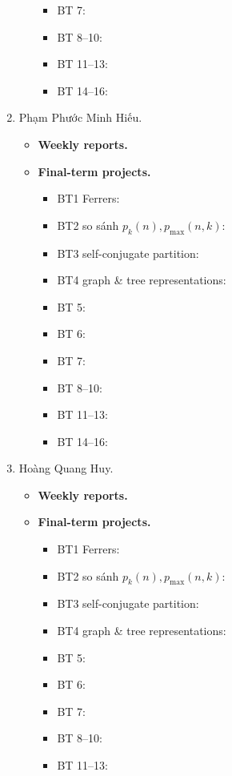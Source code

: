 \documentclass{article}
\begin{document}
\begin{enumerate}
\begin{itemize}
\begin{itemize}
            \item BT 7:
            \item BT 8--10:
            \item BT 11--13:
            \item BT 14--16:
        \end{itemize}
    \end{itemize}
    \item {\sc Phạm Phước Minh Hiếu.}
    \begin{itemize}
        \item {\bf Weekly reports.}
        \item {\bf Final-term projects.}
        \begin{itemize}
            \item BT1 Ferrers:
            \item BT2 so sánh $p_k(n),p_{\max}(n,k)$:
            \item BT3 self-conjugate partition:
            \item BT4 graph \& tree representations:
            \item BT 5:
            \item BT 6:
            \item BT 7:
            \item BT 8--10:
            \item BT 11--13:
            \item BT 14--16:
        \end{itemize}
    \end{itemize}
    \item {\sc Hoàng Quang Huy.}
    \begin{itemize}
        \item {\bf Weekly reports.}
        \item {\bf Final-term projects.}
        \begin{itemize}
            \item BT1 Ferrers:
            \item BT2 so sánh $p_k(n),p_{\max}(n,k)$:
            \item BT3 self-conjugate partition:
            \item BT4 graph \& tree representations:
            \item BT 5:
            \item BT 6:
            \item BT 7:
            \item BT 8--10:
            \item BT 11--13:

\end{itemize}
\end{itemize}
\end{enumerate}
\end{document}
